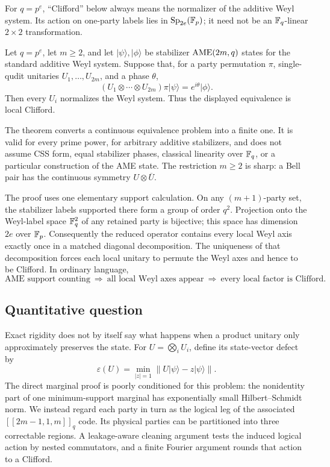 For \(q=p^e\), ``Clifford'' below always means the normalizer of the
additive Weyl system.  Its action on one-party labels lies in
\(\operatorname{Sp}_{2e}(\mathbb F_p)\); it need not be an \(\mathbb F_q\)-linear
\(2\times2\) transformation.

\begin{theorem}\label{thm:lu-lc-rigidity}
Let \(q=p^e\), let \(m\geq2\), and let
\(\lvert\psi\rangle,\lvert\phi\rangle\) be stabilizer
\(\mathrm{AME}(2m,q)\) states for the standard additive Weyl system.  Suppose
that, for a party permutation \(\pi\), single-qudit unitaries
\(U_1,\ldots,U_{2m}\), and a phase \(\theta\),
\[
 (U_1\otimes\cdots\otimes U_{2m})\pi\lvert\psi\rangle
   =e^{i\theta}\lvert\phi\rangle .
\]
Then every \(U_i\) normalizes the Weyl system.  Thus the displayed
equivalence is local Clifford.
\end{theorem}

The theorem converts a continuous equivalence problem into a finite one.
It is valid for every prime power, for arbitrary additive stabilizers, and
does not assume CSS form, equal stabilizer phases, classical linearity over
\(\mathbb F_q\), or a particular construction of the AME state.  The restriction
\(m\geq2\) is sharp: a Bell pair has the continuous symmetry
\(U\otimes\overline U\).

The proof uses one elementary support calculation.  On any \((m+1)\)-party
set, the stabilizer labels supported there form a group of order \(q^2\).
Projection onto the Weyl-label space \(\mathbb F_q^2\) of any retained party
is bijective; this space has dimension \(2e\) over \(\mathbb F_p\).  Consequently the reduced operator contains every local Weyl
axis exactly once in a matched diagonal decomposition.  The uniqueness of
that decomposition forces each local unitary to permute the Weyl axes and
hence to be Clifford.  In ordinary language,
\[
 \text{AME support counting}\ \Longrightarrow\
 \text{all local Weyl axes appear}\ \Longrightarrow\
 \text{every local factor is Clifford}.                 \tag{1.1}
\]

\subsection*{Quantitative question}

Exact rigidity does not by itself say what happens when a product unitary
only approximately preserves the state.  For
\(U=\bigotimes_iU_i\), define its state-vector defect by
\[
 \varepsilon(U)=\min_{|z|=1}
   \lVert U\lvert\psi\rangle-z\lvert\psi\rangle\rVert.
\]
The direct marginal proof is poorly conditioned for this problem: the
nonidentity part of one minimum-support marginal has exponentially small
Hilbert--Schmidt norm.  We instead regard each party in turn as the logical
leg of the associated \([[2m-1,1,m]]_q\) code.  Its physical parties can be
partitioned into three correctable regions.  A leakage-aware cleaning
argument tests the induced logical action by nested commutators, and a
finite Fourier argument rounds that action to a Clifford.

